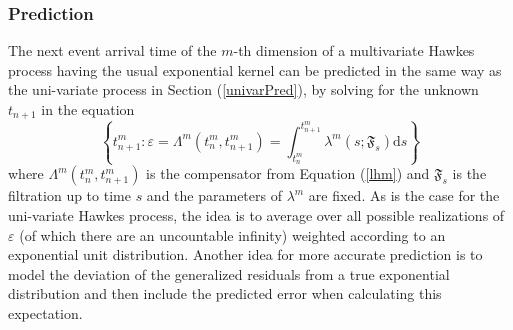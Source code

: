 \documentclass{amsart}
\newcommand{\mathd}{\mathrm{d}}
\begin{document}
\subsubsection{Prediction}\label{multivarPred}

The next event arrival time of the $m$-th dimension of a multivariate Hawkes
process having the usual exponential kernel can be predicted in the same way
as the uni-variate process in Section (\ref{univarPred}), by solving for the
unknown $t_{n + 1}$ in the equation
\begin{equation}
  \left\{ t_{n + 1}^m : \varepsilon = \Lambda^m ( t_n^m, t_{n + 1}^m) =
  \int_{t^m_n}^{t^m_{n + 1}} \lambda^m ( s ; \mathfrak{F}_s) \mathd s
  \label{mp} \right\}
\end{equation}
where $\Lambda^m ( t_n^m, t_{n + 1}^m)$ is the compensator from Equation
(\ref{lhm}) and $\mathfrak{F}_s$ is the filtration up to time $s$ and the
parameters of $\lambda^m$ are fixed. As is the case for the uni-variate Hawkes
process, the idea is to average over all possible realizations of
$\varepsilon$ (of which there are an uncountable infinity) weighted according
to an exponential unit distribution. Another idea for more accurate prediction
is to model the deviation of the generalized residuals from a true exponential
distribution and then include the predicted error when calculating this
expectation.
\end{document}
